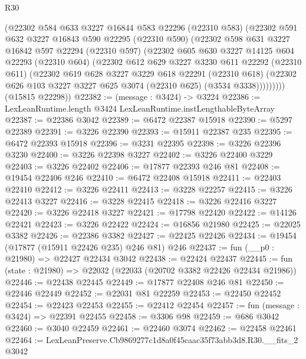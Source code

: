 \begin{lexlean}{R30}
\begin{coremodule}
        (@22302
          @584
          @633
          @3227
          @16844
          @583
          @22296
          (@22310 @583)
          (@22302
            @591
            @632
            @3227
            @16843
            @590
            @22295
            (@22310 @590)
            (@22302
              @598
              @631
              @3227
              @16842
              @597
              @22294
              (@22310 @597)
              (@22302
                @605
                @630
                @3227
                @14125
                @604
                @22293
                (@22310 @604)
                (@22302
                  @612
                  @629
                  @3227
                  @3230
                  @611
                  @22292
                  (@22310 @611)
                  (@22302
                    @619
                    @628
                    @3227
                    @3229
                    @618
                    @22291
                    (@22310 @618)
                    (@22302 @626 @103 @3227 @3227 @625 @3074 (@22310 @625) (@3534 @3338)))))))))
      (@15815 @22298))
@22382 := (message : @3424) -> @3224
@22386 := LexLeanRuntime.length @3424 LexLeanRuntime.instLengthableByteArray
@22387 := @22386 @3042
@22389 := @6472 @22387 @15918
@22390 := @5297 @22389
@22391 := @3226 @22390
@22393 := @15911 @22387 @235
@22395 := @6472 @22393 @15918
@22396 := @3231 @22395
@22398 := @3226 @22396 @3230
@22400 := @3226 @22398 @3227
@22402 := @3226 @22400 @3229
@22403 := @3226 @22402
@22406 := @17877 @22393 @246 @81
@22408 := @19454 @22406 @246
@22410 := @6472 @22408 @15918
@22411 := @22403 @22410
@22412 := @3226 @22411
@22413 := @3228 @22257
@22415 := @3226 @22413 @3227
@22416 := @3228 @22415
@22418 := @3226 @22416 @3227
@22420 := @3226 @22418 @3227
@22421 := @17798 @22420
@22422 := @14126 @22421
@22423 := @3226 @22422
@22424 := @16856 @21980
@22425 := @22025 @3382
@22426 := @22386 @3382
@22427 := @22425 @22426
@22434 := @19454 (@17877 (@15911 @22426 @235) @246 @81) @246
@22437 := fun (__p0 : @21980) => @22427 @22434 @3042
@22438 := @22424 @22437
@22445 := fun (state : @21980) => @22032 (@22033 (@20702 @3382 @22426 @22434 @21986))
@22446 := @22438 @22445
@22449 := @17877 @22408 @246 @81
@22450 := @22446 @22449
@22452 := @22031 @81 @22259
@22453 := @22450 @22452
@22454 := @22423 @22453
@22455 := @22412 @22454
@22457 := fun (message : @3424) => @22391 @22455
@22458 := @3306 @98
@22459 := @686 @3042
@22460 := @3040 @22459
@22461 := @22460 @3074
@22462 := @22458 @22461
@22464 := LexLeanPreserve.Cb9869277c1d8a0f45caac35f73abb3d8.R30.__fits_2 @3042

\end{coremodule}
\end{lexlean}
